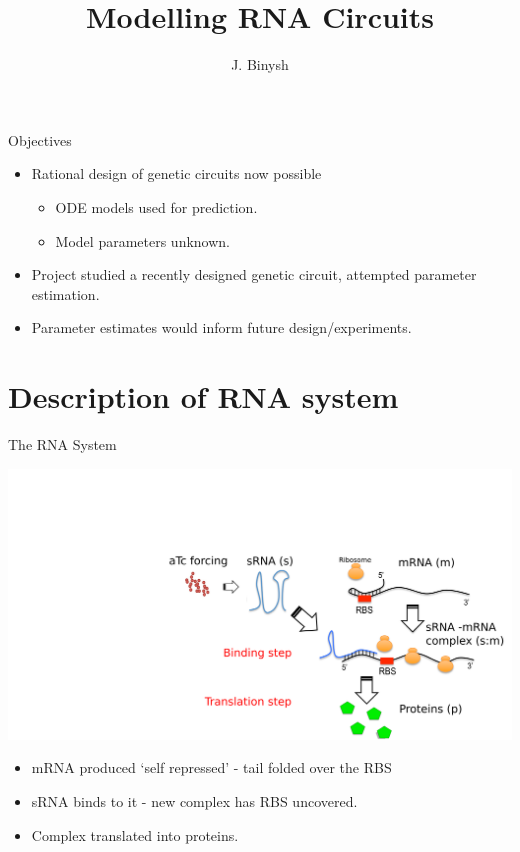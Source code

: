 \documentclass{beamer}
\title %
{Modelling RNA Circuits}
\subtitle
{}
\author %
{J. Binysh\inst{1}}
\institute[University of Warwick] %
{
  \inst{1}%
 	Centre for Complexity Science\\
  University of Warwick
 }
\begin{document}
\begin{frame}
  \titlepage
\end{frame}


\begin{frame}{Objectives}{}
  \begin{itemize}
    \item  Rational design of genetic circuits now possible
      \begin{itemize}
      \item ODE models used for prediction.
      \item Model parameters unknown.
      \end{itemize}
    \item Project studied a recently designed genetic circuit, attempted parameter estimation.
    \item Parameter estimates would inform future design/experiments.
        \end{itemize}
\end{frame}

\section{Description of RNA system}

\begin{frame}{The RNA System}{}
  \begin{center}
  \includegraphics[trim = 370 0 0 200,clip = true,scale = 0.4]{Figures/schematic_initial_with_forcing.png}
  \end{center}

  \begin{itemize}
    \item  mRNA produced `self repressed'  - tail folded over the RBS
    \item  sRNA binds to it - new complex has RBS uncovered.
    \item Complex translated into proteins.
    \end{itemize}
\end{frame}
\end{document}
